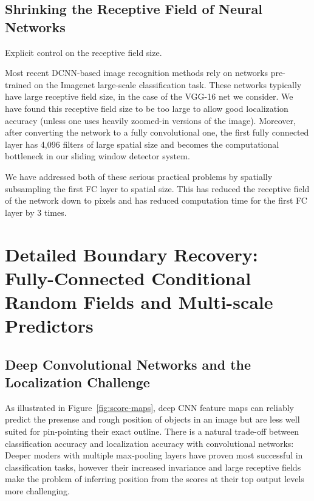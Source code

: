 \subsection{Shrinking the Receptive Field of Neural Networks}
\label{sec:convnet-field}

Explicit control on the receptive field size.

Most recent DCNN-based image recognition methods rely on networks pre-trained
on the Imagenet large-scale classification task. These networks typically have
large receptive field size,  in the case of the VGG-16 net we
consider. We have found this receptive field size to be too large to allow
good localization accuracy (unless one uses heavily zoomed-in versions of the
image). Moreover, after converting the network to a fully convolutional one,
the first fully connected layer has 4,096 filters of large  spatial
size and becomes the computational bottleneck in our sliding window detector
system.

We have addressed both of these serious practical problems by spatially
subsampling the first FC layer to  spatial size. This has reduced the
receptive field of the network down to  pixels and has reduced
computation time for the first FC layer by 3 times.


\section{Detailed Boundary Recovery: Fully-Connected Conditional Random Fields
  and Multi-scale Predictors}
\label{sec:boundary-recovery}

\subsection{Deep Convolutional Networks and the Localization Challenge}
\label{sec:local-chal}

As illustrated in Figure~\ref{fig:score-maps}, deep CNN feature maps can
reliably predict the presense and rough position of objects in an image but
are less well suited for pin-pointing their exact outline. There is a natural
trade-off between classification accuracy and localization accuracy with
convolutional networks: Deeper moders with multiple max-pooling layers have
proven most successful in classification tasks, however their increased
invariance and large receptive fields make the problem of inferring position
from the scores at their top output levels more challenging.

